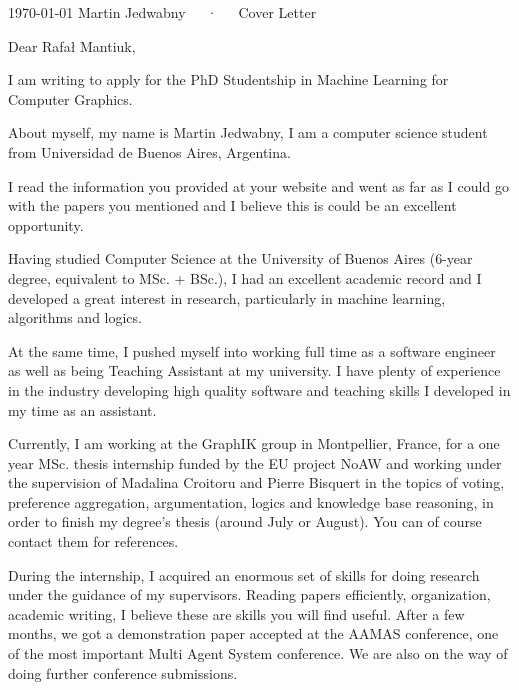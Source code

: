 \documentclass[11pt, a4paper]{awesome-cv}
\begin{document}
\makecvheader[R]

\makecvfooter
  {\today}
  {Martin Jedwabny~~~·~~~Cover Letter}
  {}


\begin{cvletter}

  Dear Rafał Mantiuk,

  I am writing to apply for the PhD Studentship in Machine Learning for Computer Graphics.
  
  About myself, my name is Martin Jedwabny, I am a computer science student from Universidad de Buenos Aires, Argentina.

  I read the information you provided at your website and went as far as I could go with the papers you mentioned and 
  I believe this is could be an excellent opportunity.

  Having studied Computer Science at the University of Buenos Aires (6-year degree, equivalent to MSc. + BSc.), 
  I had an excellent academic record and I developed a great interest in research, particularly in machine learning, algorithms and logics.
  
  At the same time, I pushed myself into working full time as a software engineer as well as being Teaching Assistant at my university. 
  I have plenty of experience in the industry developing high quality software and teaching skills I developed in my time as an assistant.
  
  Currently, I am working at the GraphIK group in Montpellier, France, for a one year MSc. thesis internship funded by the EU project NoAW and
  working under the supervision of Madalina Croitoru and Pierre Bisquert in the topics of voting, preference aggregation, argumentation,
  logics and knowledge base reasoning, in order to finish my degree's thesis (around July or August). You can of course contact them for references.
  
  During the internship, I acquired an enormous set of skills for doing research under the guidance of my supervisors.
  Reading papers efficiently, organization, academic writing, I believe these are skills you will find useful.
  After a few months, we got a demonstration paper accepted at the AAMAS conference, one of the most important
  Multi Agent System conference. We are also on the way of doing further conference submissions.
  

\end{cvletter}
\end{document}
